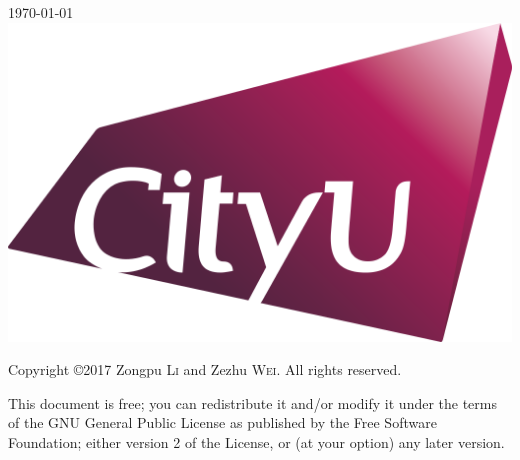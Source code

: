 \documentclass[UTF8,a4paper,10pt,openany]{book}
\theoremstyle{plain}
\theoremstyle{definition}
\begin{document}
\begin{titlepage}



{\large \today}\\[2cm] %

\vspace{5cm}
\includegraphics[scale=0.1]{figures/CityU_logo_2015.png}\\[1cm] %
 

\vfill %
\end{titlepage}

\noindent
Copyright \copyright 2017 Zongpu \textsc{Li} and Zezhu \textsc{Wei}. All rights reserved.

This document is free; you can redistribute it and/or modify it under the terms of the GNU General Public License as published by the Free Software Foundation; either version 2 of the License, or (at your option) any later version.
\end{document}
